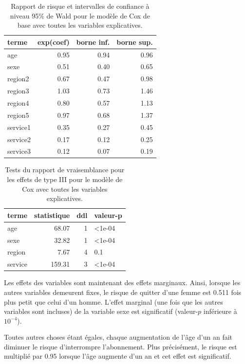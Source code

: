 \documentclass[
  11pt,
  letterpaper,
]{scrbook}
\theoremstyle{definition}
\theoremstyle{remark}
\begin{document}
\begin{longtable}[t]{lrrr}

\caption{\label{tbl-survie5-coefs}Rapport de risque et intervalles de
confiance à niveau 95\% de Wald pour le modèle de Cox de base avec
toutes les variables explicatives.}

\tabularnewline

\toprule
terme & exp(coef) & borne inf. & borne sup.\\
\midrule
age & 0.95 & 0.94 & 0.96\\
sexe & 0.51 & 0.40 & 0.65\\
region2 & 0.67 & 0.47 & 0.98\\
region3 & 1.03 & 0.73 & 1.46\\
region4 & 0.80 & 0.57 & 1.13\\
\addlinespace
region5 & 0.97 & 0.68 & 1.37\\
service1 & 0.35 & 0.27 & 0.45\\
service2 & 0.17 & 0.12 & 0.25\\
service3 & 0.12 & 0.07 & 0.19\\
\bottomrule

\end{longtable}

\begin{longtable}[t]{lrrl}

\caption{\label{tbl-survie5-deviance}Tests du rapport de vraisemblance
pour les effets de type III pour le modèle de Cox avec toutes les
variables explicatives.}

\tabularnewline

\toprule
terme & statistique & ddl & valeur-p\\
\midrule
age & 68.07 & 1 & <1e-04\\
sexe & 32.82 & 1 & <1e-04\\
region & 7.67 & 4 & 0.1\\
service & 159.31 & 3 & <1e-04\\
\bottomrule

\end{longtable}

Les effets des variables sont maintenant des effets marginaux. Ainsi,
lorsque les autres variables demeurent fixes, le risque de quitter d'une
femme est 0.511 fois plus petit que celui d'un homme. L'effet marginal
(une fois que les autres variables sont incluses) de la variable sexe
est significatif (valeur-\(p\) inférieure à \(10^{-4}\)).

Toutes autres choses étant égales, chaque augmentation de l'âge d'un an
fait diminuer le risque d'interrompre l'abonnement. Plus précisément, le
risque est multiplié par 0.95 lorsque l'âge augmente d'un an et cet
effet est significatif.
\end{document}
